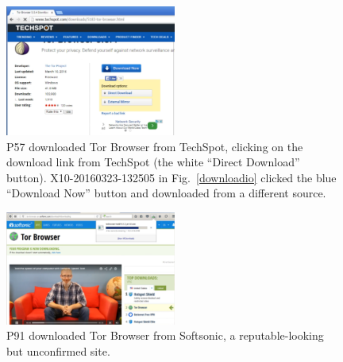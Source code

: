 \documentclass[USenglish,oneside,twocolumn]{article}
\begin{document}
\begin{figure}[h]
\includegraphics[width=0.5\textwidth]{../experiment/processing/bad-participants/20160323-133257-techspot.png}
\caption{P57 downloaded Tor Browser from TechSpot, clicking on the download link from 
TechSpot (the white ``Direct Download'' button). X10-20160323-132505 in Fig.~\ref{downloadio} clicked the blue ``Download Now'' button and downloaded from a different source.}
\label{techspot}
\end{figure}

\begin{figure}[h]
\includegraphics[width=0.5\textwidth]{../experiment/processing/bad-participants/20160330-161511-softsonic.png}
\caption{P91 downloaded Tor Browser from Softsonic, a reputable-looking but
unconfirmed site.}
\label{softsonic}
\end{figure}
\end{document}
